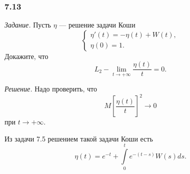 \subsubsection*{7.13}

\textit{Задание.}
Пусть $ \eta $ --- решение задачи Коши
$$ \begin{cases}
    \eta' \left( t \right) = -\eta \left( t \right) + W \left( t \right), \\
    \eta \left( 0 \right) = 1.
  \end{cases}$$
Докажите, что
$$L_2-\lim \limits_{t \to +\infty } \frac{ \eta \left( t \right) }{t} =
  0.$$

\textit{Решение.}
Надо проверить, что
$$M \left[ \frac{ \eta \left( t \right) }{t} \right]^2 \to
  0$$
при $t \to +\infty $.

Из задачи 7.5 решением такой задачи Коши есть
$$ \eta \left( t \right) =
  e^{-t} + \int \limits_0^t e^{-\left( t - s \right) } W \left( s \right) ds.$$

